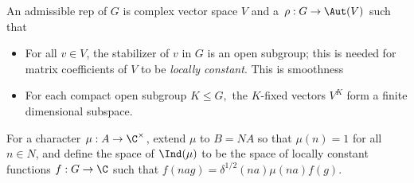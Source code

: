 \begin{figure}
	\centering
\end{figure}

An admissible rep of $G$ is complex vector space $V$ and a $\rho : G \to \Aut(V)$ such that 
\begin{itemize}
	\item For all $v\in V$, the stabilizer of $v$ in $G$ is an open subgroup; this is needed for matrix coefficients of $V$ to be \emph{locally constant}. This is smoothness
	\item For each compact open subgroup $K\leq G,$ the $K$-fixed vectors $V^K$ form a finite dimensional subspace.
\end{itemize}

For a character $\mu :A \to \C^\times$, extend $\mu$ to $B=NA$ so that $\mu(n) =1$ for all $n\in N$, and define the space of $\Ind(\mu)$ to be the space of locally constant functions $f: G \to \C$ such that $f(n a g) = \delta^{1/2}(n a)\mu(n a)f(g)$. 




